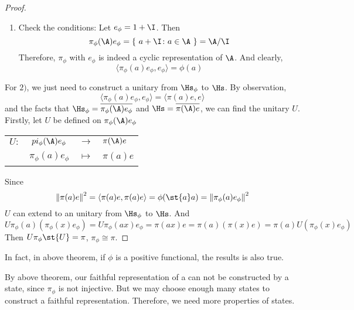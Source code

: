 \begin{proof}
\begin{enumerate}[label=\arabic*)]
		\item Check the conditions: Let $e_{\phi} = 1+\I$. Then
		\begin{equation*}
			\pi_{\phi}(\A)e_{\phi} = \{~a+\I \colon a \in \A~\} = \A / \I
		\end{equation*}
		Therefore, $\pi_{\phi}$ with $e_{\phi}$ is indeed a cyclic representation of $\A$. And clearly,
		\begin{equation*}
			\langle \pi_{\phi}(a)e_{\phi}, e_{\phi} \rangle = \phi(a)
		\end{equation*}
	\end{enumerate}
	For $2)$, we just need to construct a unitary from $\Hs_{\phi}$ to $\Hs$. By observation, 
	\begin{equation*}
		\langle \pi_{\phi}(a)e_{\phi}, e_{\phi} \rangle =\langle \pi(a)e, e \rangle
	\end{equation*}
	and the facts that $\Hs_{\phi}=\clo{\pi_{\phi}(\A)e_{\phi}}$ and $\Hs=\clo{\pi(\A)e}$, we can find the unitary $U$. Firstly, let $U$ be defined on $\pi_{\phi}(\A)e_{\phi}$ 
	\begin{center}
		\begin{tabular}{l c c l}
			$U \colon$ & $pi_{\phi}(\A)e_{\phi}$ & $\longrightarrow$ & $\pi(\A)e$ \\
			~ & $\pi_{\phi}(a)e_{\phi}$ & $\longmapsto$ & $\pi(a)e$
		\end{tabular}
	\end{center}
	Since
	\begin{equation*}
		\norm{\pi(a)e}^2 = \langle \pi(a)e, \pi(a)e \rangle = \phi(\st{a}a) = \norm{\pi_{\phi}(a)e_{\phi}}^2
	\end{equation*}
	$U$ can extend to an unitary from $\Hs_{\phi}$ to $\Hs$. And
	\begin{equation*}
		U\pi_{\phi}(a)(\pi_{\phi}(x)e_{\phi}) = U\pi_{\phi}(ax)e_{\phi}=\pi(ax)e = \pi(a)(\pi(x)e) = \pi(a)U(\pi_{\phi}(x)e_{\phi})
	\end{equation*}
	Then $U\pi_{\phi}\st{U} = \pi$, $\pi_{\phi} \cong \pi$.
\end{proof}
\begin{rem}
	In fact, in above theorem, if $\phi$ is a positive functional, the results is also true.
\end{rem}

By above theorem, our faithful representation of a \Cs can not be constructed by a state, since $\pi_{\phi}$ is not injective. But we may choose enough many states to construct a faithful representation. Therefore, we need more properties of states.


